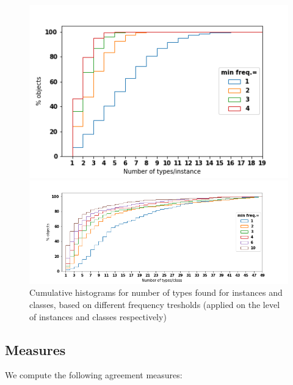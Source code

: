 \begin{figure}
\begin{minipage}[b]{0.4\linewidth}
\includegraphics[scale=.4]{Figures/types_instances.png}
\end{minipage}
\begin{minipage}[b]{0.6\linewidth}
\includegraphics[scale=.4]{Figures/types_classes.png}
\end{minipage}
 \caption{\label{fig:ntypes} Cumulative histograms for number of types found for instances and classes, based on different frequency tresholds (applied on the level of instances and classes respectively)}
\end{figure}


\subsection{Measures}

We compute the following agreement measures:

